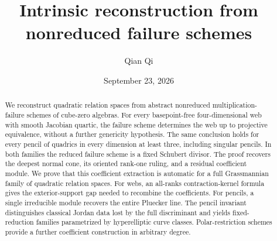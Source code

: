 \title[Intrinsic reconstruction from failure schemes]{Intrinsic reconstruction from nonreduced failure schemes}
\author{Qian Qi}
\date{September 23, 2026}
\begin{abstract}
We reconstruct quadratic relation spaces from abstract nonreduced
multiplication-failure schemes of cube-zero algebras.  For every
basepoint-free four-dimensional web with smooth Jacobian quartic,
the failure scheme determines the web up to projective equivalence,
without a further genericity hypothesis.  The same conclusion holds
for every pencil of quadrics in every dimension at least three,
including singular pencils.  In both families the reduced failure
scheme is a fixed Schubert divisor.  The proof recovers the deepest
normal cone, its oriented rank-one ruling, and a residual coefficient
module.  We prove that this coefficient extraction is automatic for
a full Grassmannian family of quadratic relation spaces.  For webs,
an all-ranks contraction-kernel formula gives the exterior-support
gap needed to recombine the coefficients.  For pencils, a single
irreducible module recovers the entire Pluecker line.  The pencil
invariant distinguishes classical Jordan data lost by the full
discriminant and yields fixed-reduction families parametrized by
hyperelliptic curve classes.  Polar-restriction schemes provide a
further coefficient construction in arbitrary degree.
\end{abstract}
\maketitle
